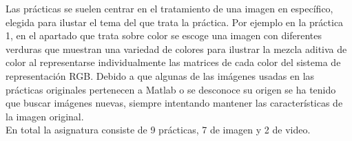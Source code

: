 Las prácticas se suelen centrar en el tratamiento de una imagen en específico, elegida para ilustar el tema del que trata la práctica. Por ejemplo en la práctica 1, en el apartado que trata sobre color se escoge una imagen con diferentes verduras que muestran una variedad de colores para ilustrar la mezcla aditiva de color al representarse individualmente las matrices de cada color del sistema de representación RGB. Debido a que algunas de las imágenes usadas en las prácticas originales pertenecen a Matlab o se desconoce su origen se ha tenido que buscar imágenes nuevas, siempre intentando mantener las características de la imagen original.\\

En total la asignatura consiste de 9 prácticas, 7 de imagen y 2 de video. \\

